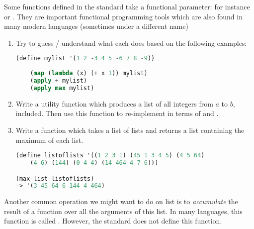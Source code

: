 \documentclass{../../../tp}
\begin{document}
\begin{instruction}
	Some functions defined in the \scheme standard take a functional parameter: for instance  or . They are important functional programming tools which are also found in many modern languages (sometimes under a different name)
	
	\begin{enumerate}
		\item 	Try to guess / understand what each does based on the following examples:
	
	\begin{lstlisting}[language=lisp]
	(define mylist '(1 2 -3 4 5 -6 7 8 -9))
	
	(map (lambda (x) (+ x 1)) mylist)
	(apply + mylist)
	(apply max mylist)
	\end{lstlisting}

	\item Write a  utility function which produces a list of all integers from $a$ to $b$, included. Then use this function to re-implement   in terms of  and  .

	\item Write a function which takes a list of lists and returns a list containing the maximum of each list.

	\begin{lstlisting}[language=lisp]	
(define listoflists '((1 2 3 1) (45 1 3 4 5) (4 5 64) 
	(4 6) (144) (0 4 4) (14 464 4 7 6)))

(max-list listoflists)
-> '(3 45 64 6 144 4 464)
	\end{lstlisting}
	\end{enumerate}
\end{instruction}

Another common operation we might want to do on list is to \emph{accumulate} the result of a function over all the arguments of this list. In many languages, this function is called . However, the \scheme standard does not define this function. 
\end{document}
